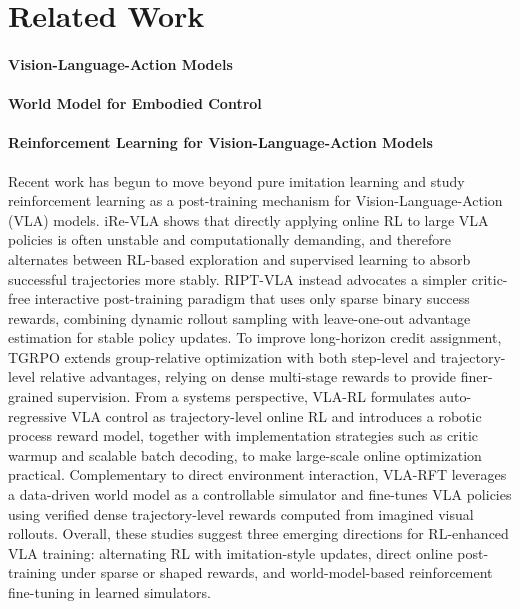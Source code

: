 \section{Related Work}

\paragraph{Vision-Language-Action Models}

\paragraph{World Model for Embodied Control}

\paragraph{Reinforcement Learning for Vision-Language-Action Models}
Recent work has begun to move beyond pure imitation learning and study reinforcement learning as a post-training mechanism for Vision-Language-Action (VLA) models. iRe-VLA shows that directly applying online RL to large VLA policies is often unstable and computationally demanding, and therefore alternates between RL-based exploration and supervised learning to absorb successful trajectories more stably. RIPT-VLA instead advocates a simpler critic-free interactive post-training paradigm that uses only sparse binary success rewards, combining dynamic rollout sampling with leave-one-out advantage estimation for stable policy updates. To improve long-horizon credit assignment, TGRPO extends group-relative optimization with both step-level and trajectory-level relative advantages, relying on dense multi-stage rewards to provide finer-grained supervision. From a systems perspective, VLA-RL formulates auto-regressive VLA control as trajectory-level online RL and introduces a robotic process reward model, together with implementation strategies such as critic warmup and scalable batch decoding, to make large-scale online optimization practical. Complementary to direct environment interaction, VLA-RFT leverages a data-driven world model as a controllable simulator and fine-tunes VLA policies using verified dense trajectory-level rewards computed from imagined visual rollouts. Overall, these studies suggest three emerging directions for RL-enhanced VLA training: alternating RL with imitation-style updates, direct online post-training under sparse or shaped rewards, and world-model-based reinforcement fine-tuning in learned simulators. 